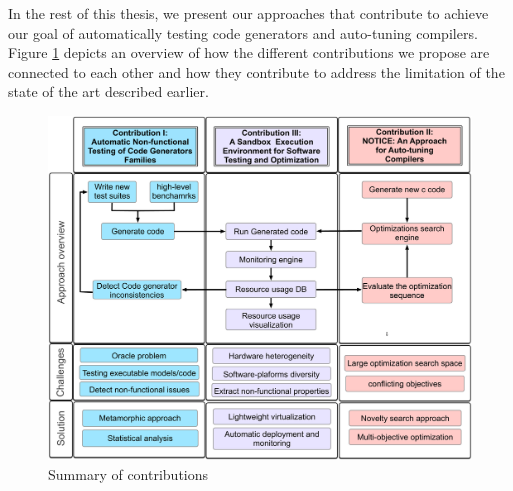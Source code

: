 

In the rest of this thesis, we present our approaches that contribute to achieve our goal of automatically testing code generators and auto-tuning compilers. Figure \ref{fig:overview} depicts an overview of how the different contributions we propose are connected to each other and how they contribute to address the limitation of the state of the art described earlier.

\begin{figure}[h]
	\center
	\includegraphics[scale=0.23]{Chapitre0/fig/overview}
	\caption{Summary of contributions}
	\label{fig:overview}
\end{figure}

